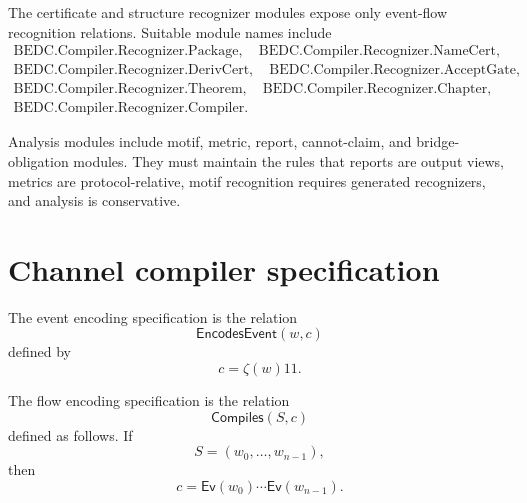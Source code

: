 \begin{definition}
\label{def:implementation-interface-certificate-recognizer-modules}
The certificate and structure recognizer modules expose only event-flow recognition relations. Suitable module names include
$$
\begin{gathered}
  \mathrm{BEDC.Compiler.Recognizer.Package},\quad
  \mathrm{BEDC.Compiler.Recognizer.NameCert},\\
  \mathrm{BEDC.Compiler.Recognizer.DerivCert},\quad
  \mathrm{BEDC.Compiler.Recognizer.AcceptGate},\\
  \mathrm{BEDC.Compiler.Recognizer.Theorem},\quad
  \mathrm{BEDC.Compiler.Recognizer.Chapter},\\
  \mathrm{BEDC.Compiler.Recognizer.Compiler}.
\end{gathered}
$$
\end{definition}

\begin{definition}
\label{def:implementation-interface-analysis-modules}
Analysis modules include motif, metric, report, cannot-claim, and bridge-obligation modules. They must maintain the rules that reports are output views, metrics are protocol-relative, motif recognition requires generated recognizers, and analysis is conservative.
\end{definition}

\section{Channel compiler specification}
\label{sec:implementation-interface-channel-spec}

\begin{definition}
\label{def:implementation-interface-event-encoder-spec}
The event encoding specification is the relation
$$
  \mathsf{EncodesEvent}(w,c)
$$
defined by
$$
  c=\zeta(w)11.
$$
\end{definition}

\begin{definition}
\label{def:implementation-interface-flow-compiler-spec}
The flow encoding specification is the relation
$$
  \mathsf{Compiles}(S,c)
$$
defined as follows. If
$$
  S=(w_0,\ldots,w_{n-1}),
$$
then
$$
  c=\mathsf{Ev}(w_0)\cdots\mathsf{Ev}(w_{n-1}).
$$
\end{definition}

